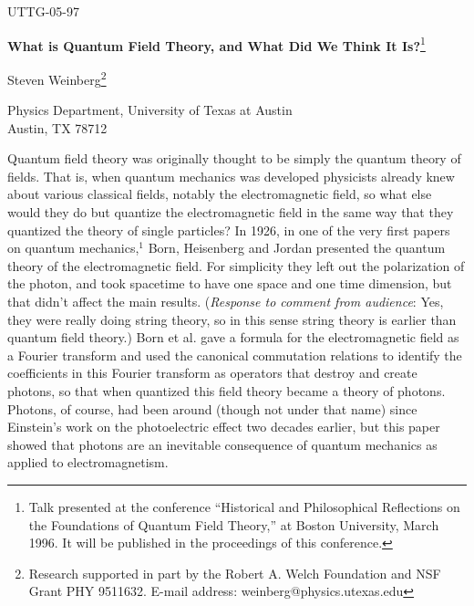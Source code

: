 \documentclass[12pt]{article}
\def\fnote#1#2{\begingroup\def\thefootnote{#1}\footnote{#2}
\endgroup}
\begin{document}
\hfill UTTG-05-97

\begin{center}
{\bf What is Quantum Field Theory, and What Did We Think It
Is?}\fnote{*}{Talk presented at the conference ``Historical
and Philosophical Reflections on the Foundations of Quantum
Field Theory,'' at Boston University, March 1996.  It will
be
published in the proceedings of this conference.}

\vspace{12pt}
\noindent
Steven Weinberg\fnote{**}{Research supported in part by the
Robert A. Welch
 Foundation and NSF Grant PHY 9511632.  E-mail address:
weinberg@physics.utexas.edu}\\{}

\vspace{12pt}
\noindent
Physics Department, University of Texas at Austin\\
Austin, TX 78712
\end{center}

\vspace{18pt}

Quantum field theory was originally thought to be simply the
quantum theory of fields.  That is, when quantum mechanics
was developed physicists already knew about various
classical fields, notably the electromagnetic field, so what
else would they do but quantize the electromagnetic field in
the same way that they quantized the theory of single
particles?  In 1926, in one of the very first papers on
quantum mechanics,$^1$ Born, Heisenberg and Jordan presented
the
quantum theory of the electromagnetic field.  For simplicity
they left out the polarization of the photon, and took
spacetime to have one space and one time dimension, but that
didn't affect the main results.  ({\it Response to comment
from audience}:
Yes, they were really doing string theory, so in this sense
string theory is earlier than quantum field theory.)  Born
et
al. gave a formula for the electromagnetic field as a
Fourier transform and used the canonical commutation
relations to identify the coefficients in this Fourier
transform as operators that destroy and create photons, so
that when quantized this field theory became a theory of
photons.  Photons, of course, had been around (though not
under that name) since Einstein's work on the photoelectric
effect two decades earlier, but this paper showed that
photons are an inevitable consequence of quantum mechanics
as applied to electromagnetism.
\end{document}
